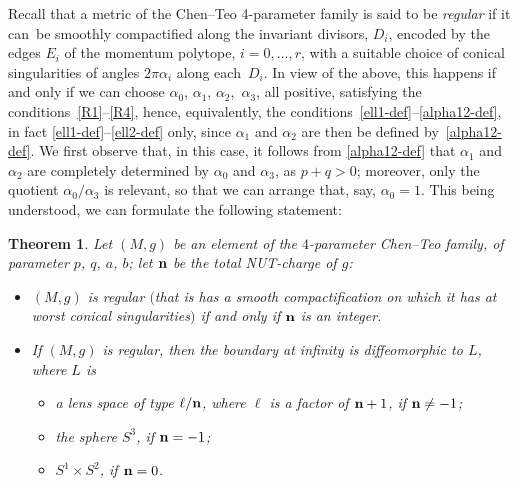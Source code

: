 \documentclass[pdftex]{sigma}
\numberwithin{equation}{section}
\newtheorem{thm}{Theorem}[section]
\begin{document}
Recall that a metric of the Chen--Teo 4-parameter family is said to be {\it regular} if it can~be smoothly compactified along the invariant divisors, $D_i$, encoded by the edges $E_i$ of the momentum polytope, $i = 0, \dots, r$, with a suitable choice of conical singularities of angles $2 \pi \alpha _i$ along each~$D_i$. In view of the above, this happens if and only if we can choose $\alpha _0$, $\alpha _1$, $\alpha _2$,~$\alpha _3$, all positive, satisfying the conditions~\eqref{R1}--\eqref{R4}, hence, equivalently, the conditions~\eqref{ell1-def}--\eqref{alpha12-def}, in fact \eqref{ell1-def}--\eqref{ell2-def} only, since $\alpha _1$ and $\alpha _2$ are then be defined by~\eqref{alpha12-def}. We first observe that, in this case, it follows from \eqref{alpha12-def} that $\alpha _1$ and $\alpha _2$ are completely determined by $\alpha _0$ and $\alpha _3$, as $p + q > 0$; moreover, only the quotient $\alpha _0/\alpha _3$ is relevant, so that we can arrange that, say, $\alpha _0 = 1$.
 This being understood, we can formulate the following statement:
\begin{thm} \label{thm-regular}
Let $(M, g)$ be an element of the $4$-parameter Chen--Teo family, of parameter $p$, $q$, $a$, $b$; let ${\bf n}$ be the total NUT-charge of $g$:
\begin{itemize}\itemsep=0pt
 \item[$(1)$] $(M, g)$ is regular $($that is has a smooth compactification on which it has at worst conical singularities$)$ if and only if ${\bf n}$ is an integer.
\item[$(2)$] If $(M, g)$ is regular, then the boundary at infinity is diffeomorphic to $L$, where $L$ is
 \begin{itemize}\itemsep=0pt
 \item[$(i)$] a lens space of type $\ell/{\bf n}$, where $\ell$ is a factor of ${\bf n} + 1$, if ${\bf n} \neq - 1$;
 \item[$(ii)$] the sphere $S ^3$, if ${\bf n} = - 1$; \item[$(iii)$] $S^1 \times S^2$, if ${\bf n} = 0$.
\end{itemize}
\end{itemize}
\end{thm}
\end{document}
